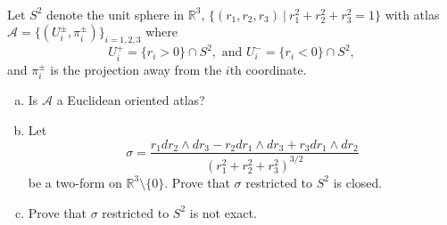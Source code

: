\documentclass{article}
\newenvironment{problem}[2][Problem]{\begin{trivlist}
\item[\hskip \labelsep {\bfseries #1}\hskip \labelsep {\bfseries #2.}]}{\end{trivlist}}
\begin{document}
\begin{problem}{2} \text{} \\
  Let $S^2$ denote the unit sphere in $\mathbb{R}^3$,
  $\{(r_1, r_2, r_3)\ |\ r_1^2 + r_2^2 + r_3^2 = 1\}$ with atlas
  $\mathcal{A} = \{(U_i^\pm, \pi_i^\pm)\}_{i=1,2,3}$ where \[
    U_i^+ = \{r_i > 0\} \cap S^2, \text{ and } U_i^- = \{r_i < 0\} \cap S^2,
  \] and $\pi_i^\pm$ is the projection away from the $i$th coordinate.
  \begin{enumerate}[(a)]
    \item Is $\mathcal{A}$ a Euclidean oriented atlas?
    \item Let \[
      \sigma = \frac{
        r_1dr_2 \wedge dr_3 - r_2dr_1 \wedge dr_3 + r_3 dr_1\wedge dr_2
      }{
        (r_1^2 + r_2^2 + r_3^2)^{3/2}
      }
    \] be a two-form on $\mathbb{R}^3\setminus \{ 0 \}$. Prove that $\sigma$
    restricted to $S^2$ is closed.
    \item Prove that $\sigma$ restricted to $S^2$ is not exact.
  \end{enumerate}
\end{problem}
\end{document}
